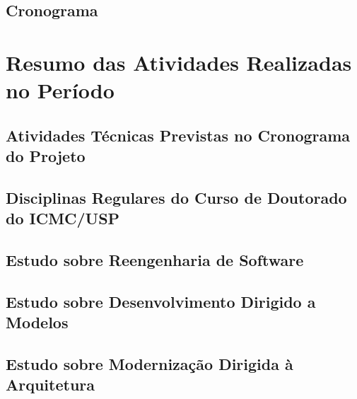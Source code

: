 \documentclass[a4paper,11pt]{article}
\begin{document}
		\subsection{Cronograma}\label{cronograma}

\section{Resumo das Atividades Realizadas no Período}\label{atividades_realizadas}

	

	\subsection{Atividades Técnicas Previstas no Cronograma do Projeto}

		

	\subsection{Disciplinas Regulares do Curso de Doutorado do ICMC/USP} %
		\label{sub:disciplinas_regulares_do_curso_de_doutorado_do_icmc_usp}
		 
		 
	
	\subsection{Estudo sobre Reengenharia de Software} %
	\label{sub:estudo_sobre_reengenharia_de_software}
		 
		 
		
	 \subsection{Estudo sobre Desenvolvimento Dirigido a Modelos} %
	 	\label{sub:estudo_sobre_desenvolvimento_dirigido_a_modelos}
	 	
	 	

	 \subsection{Estudo sobre Modernização Dirigida à Arquitetura} %
	 \label{sub:estudo_sobre_moderniza_o_dirigida_arquitetura}
	 	
\end{document}
